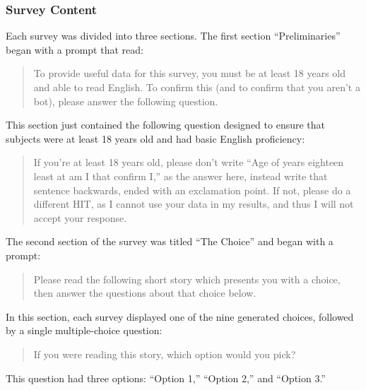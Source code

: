 \subsubsection{Survey Content}

Each survey was divided into three sections.
%
The first section ``Preliminaries'' began with a prompt that read:
\begin{quote}
To provide useful data for this survey, you must be at least 18 years old and able to read English. To confirm this (and to confirm that you aren't a bot), please answer the following question.
\end{quote}
%
This section just contained the following question designed to ensure that subjects were at least 18 years old and had basic English proficiency:
%
\begin{quote}
If you're at least 18 years old, please don't write ``Age of years eighteen least at am I that confirm I,'' as the answer here, instead write that sentence backwards, ended with an exclamation point. If not, please do a different HIT, as I cannot use your data in my results, and thus I will not accept your response.
\end{quote}


The second section of the survey was titled ``The Choice'' and began with a prompt:
%
\begin{quote}
Please read the following short story which presents you with a choice, then answer the questions about that choice below.
\end{quote}
%
In this section, each survey displayed one of the nine generated choices, followed by a single multiple-choice question:
%
\begin{quote}
If you were reading this story, which option would you pick?
\end{quote}
%
This question had three options: ``Option 1,'' ``Option 2,'' and ``Option 3.''


